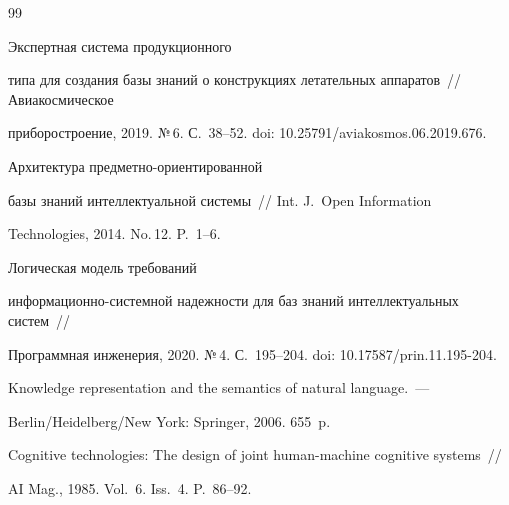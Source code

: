 \vspace*{-6pt}



{\small\frenchspacing

{%


\begin{thebibliography}{99}



\vspace*{-2pt}




 Экспертная система продукционного 

типа для создания базы знаний о конструкциях летательных аппаратов~/\!\!/ Авиакосмическое 

приборостроение, 2019. №\,6. С.~38--52. doi: 10.25791\!/\linebreak aviakosmos.06.2019.676.




 Архитектура пред\-мет\-но-ори\-ен\-ти\-ро\-ван\-ной 

базы знаний интеллектуальной сис\-те\-мы~/\!\!/ Int. J.~Open Information 

Technologies, 2014. No.\,12. P.~1--6.


 Логическая модель требований 

ин\-фор\-ма\-ци\-он\-но-сис\-тем\-ной на\-деж\-ности для баз знаний интеллектуальных сис\-тем~/\!\!/ 

Программная инженерия, 2020. №\,4. С.~195--204. doi: 10.17587\!/\!prin.11.195-204.




 Knowledge representation and the semantics of natural language.~--- 

Berlin/Heidelberg/New York: Springer, 2006. 655~p.


 Cognitive technologies: The design of joint human-machine cognitive systems~/\!\!/ 

AI Mag., 1985. Vol.~6. Iss.~4. P.~86--92.


\end{thebibliography}}}
